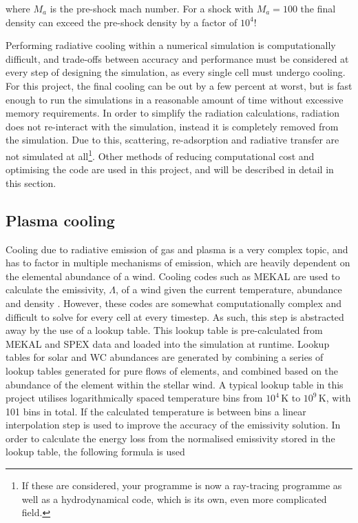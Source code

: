 \noindent
where $M_a$ is the pre-shock mach number.
For a shock with $M_a = 100$ the final density can exceed the pre-shock density by a factor of $10^4$!


Performing radiative cooling within a numerical simulation is computationally difficult, and trade-offs between accuracy and performance must be considered at every step of designing the simulation, as every single cell must undergo cooling.
For this project, the final cooling can be out by a few percent at worst, but is fast enough to run the simulations in a reasonable amount of time without excessive memory requirements.
In order to simplify the radiation calculations, radiation does not re-interact with the simulation, instead it is completely removed from the simulation.
Due to this, scattering, re-adsorption and radiative transfer are not simulated at all\footnote{If these are considered, your programme is now a ray-tracing programme as well as a hydrodynamical code, which is its own, even more complicated field.}.
Other methods of reducing computational cost and optimising the code are used in this project, and will be described in detail in this section.

\subsection{Plasma cooling}

Cooling due to radiative emission of gas and plasma is a very complex topic, and has to factor in multiple mechanisms of emission, which are heavily dependent on the elemental abundance of a wind.
Cooling codes such as MEKAL are used to calculate the emissivity, $\Lambda$, of a wind given the current temperature, abundance and density
\parencite{meweCalculatedXradiationOptically1985,meweCalculatedXradiationOptically1986}.
However, these codes are somewhat computationally complex and difficult to solve for every cell at every timestep.
As such, this step is abstracted away by the use of a lookup table.
This lookup table is pre-calculated from MEKAL and SPEX data and loaded into the simulation at runtime.
Lookup tables for solar and WC abundances are generated by combining a series of lookup tables generated for pure flows of elements, and combined based on the abundance of the element within the stellar wind.
A typical lookup table in this project utilises logarithmically spaced temperature bins from $10^4\,\si{\kelvin}$ to $10^9\,\si{\kelvin}$, with 101 bins in total.
If the calculated temperature is between bins a linear interpolation step is used to improve the accuracy of the emissivity solution.
In order to calculate the energy loss from the normalised emissivity stored in the lookup table, the following formula is used

